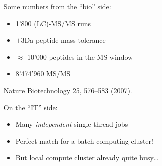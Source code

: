 \documentclass[english,serif,mathserif,xcolor=pdftex,dvipsnames,table]{beamer}
\begin{document}
\begin{frame}
\begin{columns}
\begin{column}{.30\textwidth}
    \end{column}
    \begin{column}{.75\textwidth}
      Some numbers from the ``bio'' side:
        \begin{itemize}
        \scriptsize
        \item 1'800 (LC)-MS/MS runs
        \item $\pm 3$Da peptide mass tolerance
        \item $\approx$ 10'000 peptides in the MS window
        \item 8'474'960 MS/MS
        \end{itemize}
        \begin{references}
          Nature Biotechnology 25, 576--583 (2007).
        \end{references}

        \+
        On the ``IT'' side:
        \begin{itemize}
        \scriptsize
        \item Many \emph{independent} single-thread jobs
        \item Perfect match for a batch-computing cluster!
        \item But local compute cluster already quite busy\ldots
        \end{itemize}
    \end{column}
  \end{columns}
\end{frame}

%
\end{document}
